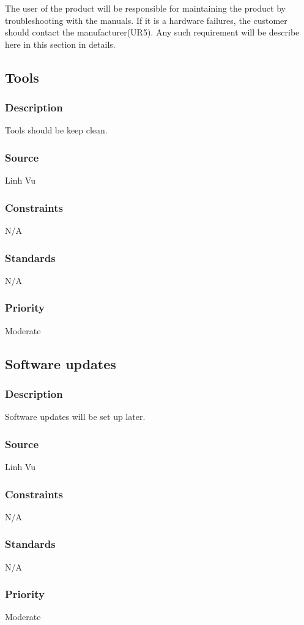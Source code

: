 The user of the product will be responsible for maintaining the product by troubleshooting with the manuals. If it is a hardware failures, the customer should contact the manufacturer(UR5). Any such requirement will be describe here in this section in details.

\subsection{Tools}
\subsubsection{Description}
Tools should be keep clean.
\subsubsection{Source}
Linh Vu
\subsubsection{Constraints}
N/A
\subsubsection{Standards}
N/A
\subsubsection{Priority}
Moderate

\subsection{Software updates}
\subsubsection{Description}
Software updates will be set up later.
\subsubsection{Source}
Linh Vu
\subsubsection{Constraints}
N/A
\subsubsection{Standards}
N/A
\subsubsection{Priority}
Moderate

